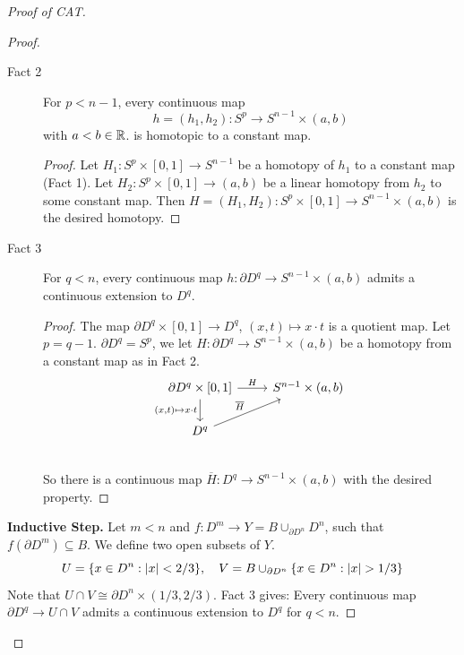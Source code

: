 \documentclass{TemplateLecture}
\begin{document}
\begin{proof}[Proof of CAT]
\begin{proof}
\begin{description}
            \item[Fact 2] For \(p < n-1\), every continuous map
            \[h = (h_1, h_2) \colon S^p \to S^{n-1} \times (a,b)\]
            with \(a < b \in \mathbb{R}\). is homotopic to a constant map.
            \begin{proof}
                Let \(H_1\colon S^p \times [0,1] \to S^{n-1}\) be a homotopy of \(h_1\) to a constant map (Fact 1).
                Let \(H_2\colon S^p \times [0,1] \to (a,b)\) be a linear homotopy from \(h_2\) to some constant map. Then \(H = (H_1, H_2) \colon S^p \times [0,1] \to S^{n-1} \times (a,b)\) is the desired homotopy.
            \end{proof}
            \item[Fact 3] For \(q < n\), every continuous map \(h\colon \partial D^q \to S^{n-1} \times (a,b)\) admits a continuous extension to \(D^q\).
            \begin{proof}
                The map \(\partial D^q \times [0,1] \to D^q\), \((x,t) \mapsto x\cdot t\) is a quotient map. Let \(p = q-1\).
                \(\partial D^q = S^p\), we let \(H\colon \partial D^q \to S^{n-1} \times (a,b)\) be a homotopy from a constant map as in Fact 2.
                \[\begin{tikzcd}
                    {\partial D^q \times [0,1]} \ar[r, "H"] \ar[d, "{(x,t) \mapsto x\cdot t}"'] & {S^{n-1} \times (a,b)} \\
                    D^q \ar[ru, "\overline H"] & \\
                \end{tikzcd}\]
                So there is a continuous map \(\overline{H}\colon D^q \to S^{n-1} \times (a,b)\) with the desired property.
            \end{proof}
        \end{description}
        \textbf{Inductive Step.} Let \(m < n\) and \(f\colon D^m \to Y = B\cup_{\partial D^n} D^n\), such that \(f(\partial D^m) \subseteq B\). We define two open subsets of \(Y\).
        \[U = \{x \in D^n : \lvert x\rvert< 2/3 \}, \quad V = B \cup_{\partial D^n} \{x \in D^n : \lvert x\rvert > 1/3\}\]
        Note that \(U \cap V \cong \partial D^n \times (1/3, 2/3)\). Fact 3 gives: Every continuous map \(\partial D^q \to U\cap V\) admits a continuous extension to \(D^q\) for \(q < n\).


\end{proof}
\end{proof}
\end{document}
